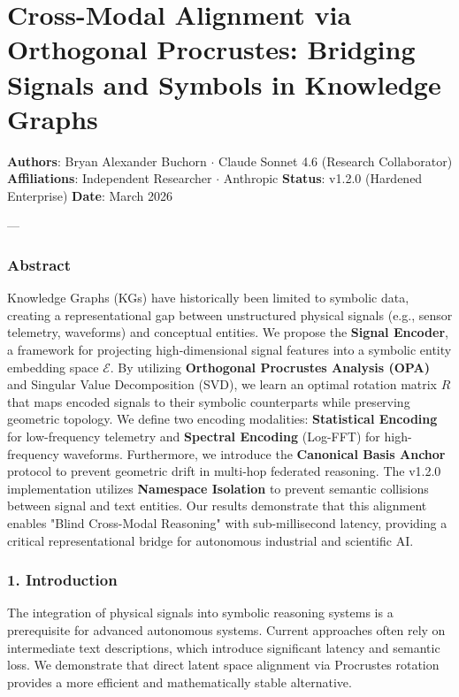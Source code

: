 \section{Cross-Modal Alignment via Orthogonal Procrustes: Bridging Signals and Symbols in Knowledge Graphs}

\textbf{Authors}: Bryan Alexander Buchorn $\cdot$ Claude Sonnet 4.6 (Research Collab\-orator)  
\textbf{Affili\-ations}: Independent Researcher $\cdot$ Anthropic  
\textbf{Status}: v1.2.0 (Hardened Enterprise)  
\textbf{Date}: March 2026

---

\subsubsection{Abstract}
Knowledge Graphs (KGs) have histo\-rically been limited to symbolic data, creating a repre\-sentational gap between unstr\-uctured physical signals (e.g., sensor telemetry, waveforms) and conceptual entities. We propose the \textbf{Signal Encoder}, a framework for projecting high-dimensional signal features into a symbolic entity embedding space $\mathcal{E}$. By utilizing \textbf{Orthogonal Procrustes Analysis (OPA)} \cite{schonemann1966procrustes, gower2004procrustes} and Singular Value Decomp\-osition (SVD), we learn an optimal rotation matrix $R$ that maps encoded signals to their symbolic count\-erparts while preserving geometric topology. We define two encoding modalities: \textbf{Statistical Encoding} for low-frequency telemetry and \textbf{Spectral Encoding} (Log-FFT) for high-frequency waveforms. Furthermore, we introduce the \textbf{Canonical Basis Anchor} protocol to prevent geometric drift in multi-hop federated reasoning. The v1.2.0 imple\-mentation utilizes \textbf{Namespace Isolation} to prevent semantic collisions between signal and text entities. Our results demonstrate that this alignment enables "Blind Cross-Modal Reasoning" with sub-millisecond latency, providing a critical repre\-sentational bridge for autonomous industrial and scientific AI.

\subsubsection{1. Introd\-uction}
The integration of physical signals into symbolic reasoning systems is a prere\-quisite for advanced autonomous systems. Current approaches often rely on inter\-mediate text descr\-iptions, which introduce significant latency and semantic loss. We demonstrate that direct latent space alignment via Procrustes rotation provides a more efficient and mathe\-matically stable alternative.

